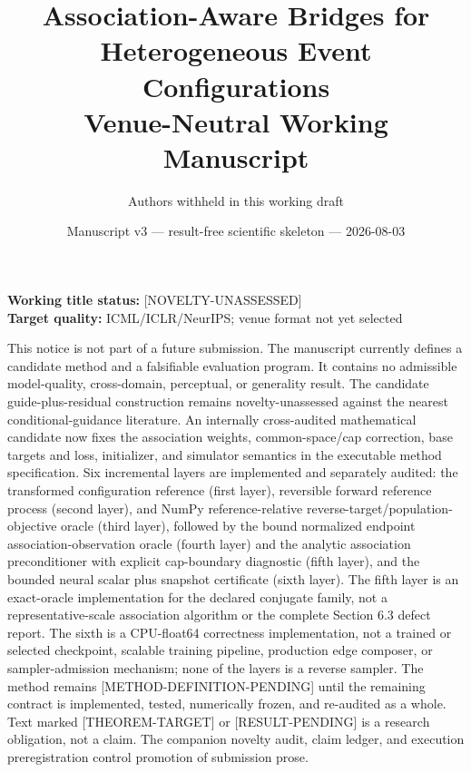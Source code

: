 \documentclass[11pt]{article}
\title{\textbf{Association-Aware Bridges for\\
Heterogeneous Event Configurations}\\[0.5em]
\large Venue-Neutral Working Manuscript}
\author{Authors withheld in this working draft}
\date{Manuscript v3 --- result-free scientific skeleton --- 2026-08-03}
\newcommand{\status}[1]{%
  \textcolor{statusred}{\textbf{\texttt{[#1]}}}%
}
\newcommand{\supportingfile}[2]{%
  \emph{#1} (\nolinkurl{#2})%
}
\def\status#1{[#1]}%
\def\supportingfile#1#2{#1}%
\begin{document}
\maketitle
\thispagestyle{fancy}

\begin{center}
\small
\textbf{Working title status:} \status{NOVELTY-UNASSESSED}\\
\textbf{Target quality:} ICML/ICLR/NeurIPS; venue format not yet selected
\end{center}
\vspace{0.5em}

\begin{internalnotice}

This notice is not part of a future submission. The manuscript currently defines a candidate method and a falsifiable evaluation program. It contains no admissible model-quality, cross-domain, perceptual, or generality result. The candidate guide-plus-residual construction remains novelty-unassessed against the nearest conditional-guidance literature. An internally cross-audited mathematical candidate now fixes the association weights, common-space/\allowbreak{}cap correction, base targets and loss, initializer, and simulator semantics in the \supportingfile{executable method specification}{executable_method_spec.md}. Six incremental layers are implemented and separately audited: the transformed configuration reference (\supportingfile{first layer}{configuration_reference_code_audit.md}), reversible forward reference process (\supportingfile{second layer}{reversible_hybrid_reference_code_audit.md}), and NumPy reference-relative reverse-target/\allowbreak{}population-objective oracle (\supportingfile{third layer}{reverse_energy_objective_code_audit.md}), followed by the bound normalized endpoint association-observation oracle (\supportingfile{fourth layer}{association_observation_code_audit.md}) and the analytic association preconditioner with explicit cap-boundary diagnostic (\supportingfile{fifth layer}{association_preconditioner_code_audit.md}), and the bounded neural scalar plus snapshot certificate (\supportingfile{sixth layer}{configuration_energy_code_audit.md}). The fifth layer is an exact-oracle implementation for the declared conjugate family, not a representative-scale association algorithm or the complete Section 6.3 defect report. The sixth is a CPU-float64 correctness implementation, not a trained or selected checkpoint, scalable training pipeline, production edge composer, or sampler-admission mechanism; none of the layers is a reverse sampler. The method remains \status{METHOD-DEFINITION-PENDING} until the remaining contract is implemented, tested, numerically frozen, and re-audited as a whole. Text marked \status{THEOREM-TARGET} or \status{RESULT-PENDING} is a research obligation, not a claim. The companion \supportingfile{novelty audit}{novelty_audit_matrix.md}, \supportingfile{claim ledger}{claim_ledger.md}, and \supportingfile{execution preregistration}{execution_preregistration.md} control promotion of submission prose.

\end{internalnotice}
\end{document}
